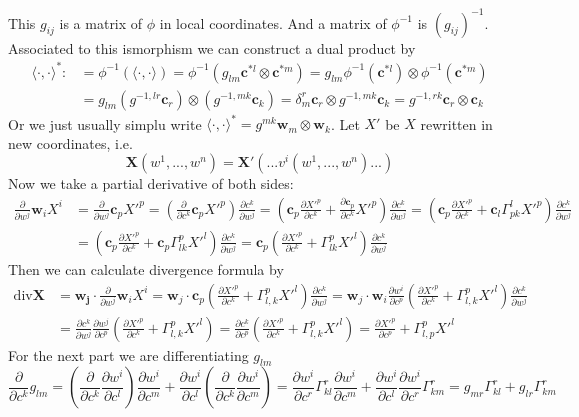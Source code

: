This $g_{ij}$ is a matrix of $\phi$ in local coordinates. And a matrix of $\phi^{-1}$ is
$(g_{ij})^{-1}$. Associated to this ismorphism we can construct a dual product by
\begin{align*}
    \langle\cdot,\cdot\rangle^*:&=\phi^{-1}(\langle\cdot,\cdot\rangle)=\phi^{-1}(g_{lm}\mathbf{c}^{*l}\otimes\mathbf{c}^{*m})
=g_{lm}\phi^{-1}(\mathbf{c}^{*l})\otimes\phi^{-1}(\mathbf{c}^{*m})\\
    &=g_{lm}(g^{-1,lr}\mathbf{c}_r)\otimes(g^{-1,mk}\mathbf{c}_k)
=\delta_m^r\mathbf{c}_r\otimes g^{-1,mk}\mathbf{c}_k=g^{-1,rk}\mathbf{c}_r\otimes \mathbf{c}_k
\end{align*}
Or we just usually simplu write $\langle\cdot,\cdot\rangle^*=g^{mk}\mathbf{w}_m\otimes \mathbf{w}_k$.
Let $X'$ be $X$ rewritten in new coordinates, i.e.
\[\mathbf{X}(w^1,...,w^n)=\mathbf{X}'(...v^i(w^1,...,w^n)...)\]
Now we take a partial derivative of both sides:
\begin{align*}
\frac{\partial}{\partial w^j}\mathbf{w}_iX^i&
=\frac{\partial}{\partial w^j}\mathbf{c}_pX'^p
=(\frac{\partial}{\partial c^k}\mathbf{c}_pX'^p)\frac{\partial c^k}{\partial w^j}
=(\mathbf{c}_p\frac{\partial X'^p}{\partial c^k}+\frac{\partial\mathbf{c}_p}{\partial c^k}X'^p)\frac{\partial c^k}{\partial w^j}
=(\mathbf{c}_p\frac{\partial X'^p}{\partial c^k}+\mathbf{c}_l\Gamma^l_{pk}X'^p)\frac{\partial c^k}{\partial w^j}\\
&=(\mathbf{c}_p\frac{\partial X'^p}{\partial c^k}+\mathbf{c}_p\Gamma^p_{lk}X'^l)\frac{\partial c^k}{\partial w^j}
=\mathbf{c}_p(\frac{\partial X'^p}{\partial c^k}+\Gamma^p_{lk}X'^l)\frac{\partial c^k}{\partial w^j}
\end{align*}
Then we can calculate divergence formula by
\begin{align*}
\text{div}\mathbf{X}&=\mathbf{w_j}\cdot\frac{\partial}{\partial w^j}\mathbf{w}_iX^i
=\mathbf{w}_j\cdot\mathbf{c}_p(\frac{\partial X'^p}{\partial c^k}+\Gamma^p_{l,k}X'^l)\frac{\partial c^k}{\partial w^j}
=\mathbf{w}_j\cdot\mathbf{w}_i\frac{\partial w^i}{\partial c^p}(\frac{\partial X'^p}{\partial c^k}+\Gamma^p_{l,k}X'^l)\frac{\partial c^k}{\partial w^j}\\
&=\frac{\partial c^k}{\partial w^j}\frac{\partial w^j}{\partial c^p}(\frac{\partial X'^p}{\partial c^k}+\Gamma^p_{l,k}X'^l)
=\frac{\partial c^k}{\partial c^p}(\frac{\partial X'^p}{\partial c^k}+\Gamma^p_{l,k}X'^l)
=\frac{\partial X'^p}{\partial c^p}+\Gamma^p_{l,p}X'^l
\end{align*}
For the next part we are differentiating $g_{lm}$
\[\frac{\partial}{\partial c^k}g_{lm}=(\frac{\partial}{\partial c^k}\frac{\partial w^i}{\partial c^l})\frac{\partial w^i}{\partial c^m}
+\frac{\partial w^i}{\partial c^l}(\frac{\partial}{\partial c^k}\frac{\partial w^i}{\partial c^m})
=\frac{\partial w^i}{\partial c^r}\Gamma^r_{kl}\frac{\partial w^i}{\partial c^m}+
\frac{\partial w^i}{\partial c^l}\frac{\partial w^i}{\partial c^r}\Gamma^r_{km}
=g_{mr}\Gamma^r_{kl}+g_{lr}\Gamma^r_{km}\]
